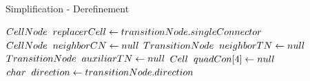 \begin{algorithm}[!ht]
    \caption{Simplification - Derefinement}
    \small{
    \begin{algorithmic}[1]
        \State $CellNode\hspace{2mm} replacerCell \gets transitionNode.singleConnector$
        \State $CellNode\hspace{2mm} neighborCN \gets null$
        \State $TransitionNode\hspace{2mm} neighborTN \gets null$
        \State $TransitionNode\hspace{2mm} auxiliarTN \gets null$
        \State $Cell\hspace{2mm} quadCon[4] \gets null$
        \State $char\hspace{2mm} direction \gets transitionNode.direction$


\end{algorithmic}}
\end{algorithm}
